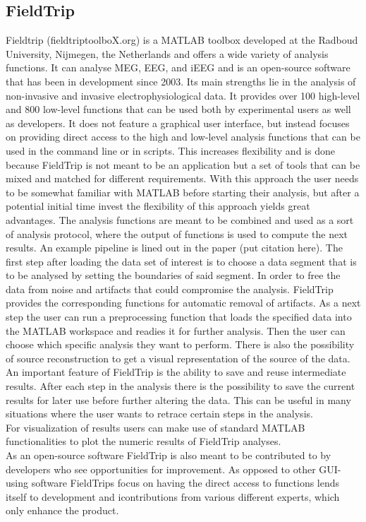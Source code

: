 \subsection{FieldTrip}
Fieldtrip (fieldtriptoolboX.org) is a MATLAB toolbox developed at the Radboud University,  Nijmegen,  the Netherlands and offers a wide variety of analysis functions.  It can analyse MEG, EEG, and iEEG and is an open-source software that has been in development since 2003. Its main strengths lie in the analysis of non-invasive and invasive electrophysiological data. It provides over 100 high-level and 800 low-level functions that can be used both by experimental users as well as developers. It does not feature a graphical user interface, but instead focuses on providing direct access to the high and low-level analysis functions that can be used in the command line or in scripts.  This increases flexibility and is done because FieldTrip is not meant to be an application but a set of tools that can be mixed and matched for different requirements.
With this approach the user needs to be somewhat familiar with MATLAB before starting their analysis, but after a potential initial time invest the flexibility of this approach yields great advantages.
The analysis functions are meant to be combined and used as a sort of analysis protocol, where the output of functions is used to compute the next results. 
An example pipeline is lined out in the paper (put citation here). The first step after loading the data set of interest is to choose a data segment that is to be analysed by setting the boundaries of said segment. In order to free the data from noise and artifacts that could compromise the analysis. FieldTrip provides the corresponding functions for automatic removal of artifacts. As a next step the user can run a preprocessing function that loads the specified data into the MATLAB workspace and readies it for further analysis. Then the user can choose which specific analysis they want to perform. There is also the possibility of source reconstruction to get a visual representation of the source of the data.\\
An important feature of FieldTrip is the ability to save and reuse intermediate results. After each step in the analysis there is the possibility to save the current results for later use before further altering the data. This can be useful in many situations where the user wants to retrace certain steps in the analysis.\\
For visualization of results users can make use of standard MATLAB functionalities to plot the numeric results of FieldTrip analyses.\\
As an open-source software FieldTrip is also meant to be contributed to by developers who see opportunities for improvement. As opposed to other GUI-using software FieldTrips focus on having the direct access to functions lends itself to development and icontributions from various different experts, which only enhance the product.

